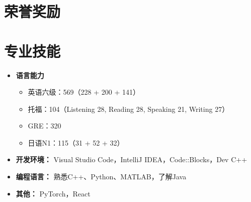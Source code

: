\documentclass{resume}
\begin{document}
\section{荣誉奖励}


\section{专业技能}

\begin{itemize}[parsep=0.5ex]
  \item \textbf{语言能力}
  \begin{itemize}
    \item 英语六级：569（228 + 200 + 141）
    \item 托福：104（Listening 28, Reading 28, Speaking 21, Writing 27）
    \item GRE：320
    \item 日语N1：115（31 + 52 + 32）
  \end{itemize}
  
  \item \textbf{开发环境：} Visual Studio Code，IntelliJ IDEA，Code::Blocks，Dev C++
  \item \textbf{编程语言：} 熟悉C++、Python、MATLAB，了解Java
  \item \textbf{其他：} PyTorch，React
\end{itemize}
\end{document}

